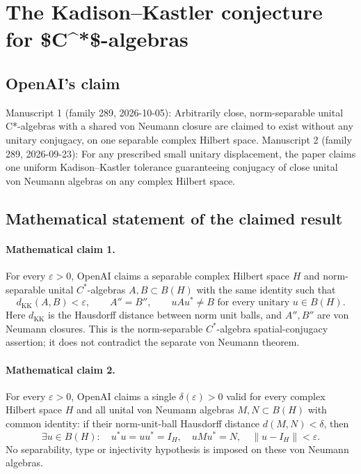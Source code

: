 \documentclass[11pt]{article}
\begin{document}
\section*{The Kadison–Kastler conjecture for \$C\textasciicircum{}*\$-algebras}

\subsection{OpenAI's claim}
Manuscript 1 (family 289, 2026-10-05): Arbitrarily close, norm-separable unital C*-algebras with a shared von Neumann closure are claimed to exist without any unitary conjugacy, on one separable complex Hilbert space. Manuscript 2 (family 289, 2026-09-23): For any prescribed small unitary displacement, the paper claims one uniform Kadison--Kastler tolerance guaranteeing conjugacy of close unital von Neumann algebras on any complex Hilbert space.

\subsection{Mathematical statement of the claimed result}
\paragraph{Mathematical claim 1.} For every $\varepsilon>0$, OpenAI claims a separable complex Hilbert space $H$ and norm-separable unital $C^*$-algebras $A,B\subset B(H)$ with the same identity such that
\[
d_{\mathrm{KK}}(A,B)<\varepsilon,\qquad A''=B'',\qquad
u Au^*\ne B\text{ for every unitary }u\in B(H).
\]
Here $d_{\mathrm{KK}}$ is the Hausdorff distance between norm unit balls, and $A'',B''$ are von Neumann closures. This is the norm-separable $C^*$-algebra spatial-conjugacy assertion; it does not contradict the separate von Neumann theorem.

\paragraph{Mathematical claim 2.} For every $\varepsilon>0$, OpenAI claims a single $\delta(\varepsilon)>0$ valid for every complex Hilbert space $H$ and all unital von Neumann algebras $M,N\subset B(H)$ with common identity: if their norm-unit-ball Hausdorff distance $d(M,N)<\delta$, then
\[
\exists u\in B(H):\quad u^*u=uu^*=I_H,\quad uMu^*=N,\quad\|u-I_H\|<\varepsilon.
\]
No separability, type or injectivity hypothesis is imposed on these von Neumann algebras.
\end{document}
